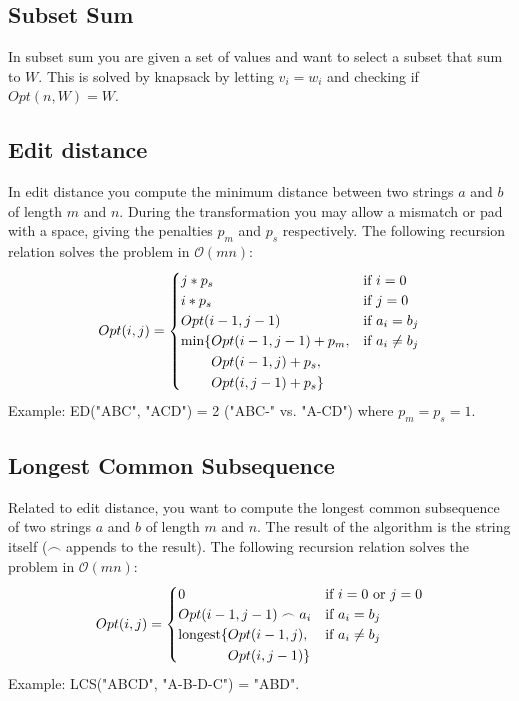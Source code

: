 \documentclass[8pt,a4paper,landscape,oneside]{amsart}
\newcommand{\bigO}{\mathcal{O}}
\begin{document}
\begin{multicols*}{3}
  \subsection{Subset Sum}
  In subset sum you are given a set of values and want to select a subset that sum to $W$. This is solved by knapsack by letting $v_i = w_i$ and checking if $Opt(n, W) = W$.
  
  \subsection{Edit distance}
  In edit distance you compute the minimum distance between two strings $a$ and $b$ of length $m$ and $n$. During the transformation you may allow a mismatch or pad with a space, giving the penalties $p_m$ and $p_s$ respectively. The following recursion relation solves the problem in $\bigO(mn)$:
  \[
  Opt(i,j) = \begin{cases}
  j*p_s & \text{if } i=0 \\
  i*p_s & \text{if } j=0 \\
  Opt(i-1,j-1) & \text{if } a_i=b_j \\
  \begin{aligned}[t]\arraycolsep=0pt
    \min\lbrace &
      Opt(i-1,j-1) + p_m, \\ &
      Opt(i-1,j) + p_s, \\ & 
      Opt(i,j-1) + p_s \rbrace
  \end{aligned} & \text{if } a_i\neq b_j
  \end{cases}
  \]
  Example: ED("ABC", "ACD") = 2 ("ABC-" vs. "A-CD") where $p_m = p_s = 1$.
  
  \subsection{Longest Common Subsequence}
  Related to edit distance, you want to compute the longest common subsequence of two strings $a$ and $b$ of length $m$ and $n$. The result of the algorithm is the string itself ($\frown$ appends to the result). The following recursion relation solves the problem in $\bigO(mn)$:
  \[
  Opt(i,j) = \begin{cases}
  0 & \text{if } i=0 \text{ or } j=0 \\
  Opt(i-1,j-1) \frown a_i & \text{if } a_i=b_j \\
  \begin{aligned}[t]\arraycolsep=0pt
    \mathrm{longest}\lbrace &
      Opt(i-1,j), \\ & 
      Opt(i,j-1) \rbrace
  \end{aligned} & \text{if } a_i\neq b_j
  \end{cases}
  \]
  Example: LCS("ABCD", "A-B-D-C") = "ABD".
        

\end{multicols*}
\end{document}
